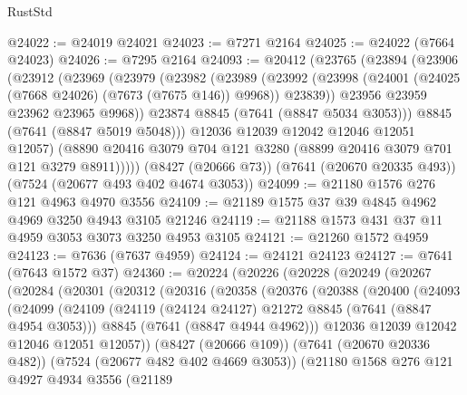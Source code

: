 \begin{lexlean}{RustStd}
\begin{coremodule}
@24022 := @24019 @24021
@24023 := @7271 @2164
@24025 := @24022 (@7664 @24023)
@24026 := @7295 @2164
@24093 := @20412
    (@23765
      (@23894
        (@23906
          (@23912
            (@23969
              (@23979
                (@23982
                  (@23989
                    (@23992
                      (@23998 (@24001 (@24025 (@7668 @24026) (@7673 (@7675 @146)) @9968)) @23839))
                    @23956
                    @23959
                    @23962
                    @23965
                    @9968))
                @23874
                @8845
                (@7641 (@8847 @5034 @3053)))
              @8845
              (@7641 (@8847 @5019 @5048)))
            @12036
            @12039
            @12042
            @12046
            @12051
            @12057)
          (@8890 @20416 @3079 @704 @121 @3280 (@8899 @20416 @3079 @701 @121 @3279 @8911)))))
    (@8427 (@20666 @73))
    (@7641 (@20670 @20335 @493))
    (@7524 (@20677 @493 @402 @4674 @3053))
@24099 := @21180 @1576 @276 @121 @4963 @4970 @3556
@24109 := @21189 @1575 @37 @39 @4845 @4962 @4969 @3250 @4943 @3105 @21246
@24119 := @21188 @1573 @431 @37 @11 @4959 @3053 @3073 @3250 @4953 @3105
@24121 := @21260 @1572 @4959
@24123 := @7636 (@7637 @4959)
@24124 := @24121 @24123
@24127 := @7641 (@7643 @1572 @37)
@24360 := @20224
    (@20226
      (@20228
        (@20249
          (@20267
            (@20284
              (@20301
                (@20312
                  (@20316
                    (@20358
                      (@20376
                        (@20388
                          (@20400
                            (@24093
                              (@24099
                                (@24109
                                  (@24119 (@24124 @24127) @21272 @8845 (@7641 (@8847 @4954 @3053)))
                                  @8845
                                  (@7641 (@8847 @4944 @4962)))
                                @12036
                                @12039
                                @12042
                                @12046
                                @12051
                                @12057))
                            (@8427 (@20666 @109))
                            (@7641 (@20670 @20336 @482))
                            (@7524 (@20677 @482 @402 @4669 @3053))
                            (@21180
                              @1568
                              @276
                              @121
                              @4927
                              @4934
                              @3556
                              (@21189

\end{coremodule}
\end{lexlean}
